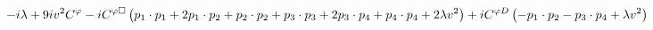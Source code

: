 %
\begin{dmath*}
%
  -  i \lambda   +  9 i v^2C^{\varphi }  -  iC^{ \varphi  \Box} \left(p_{1}\nobreak\cdot\nobreak{}p_{1} + 2 p_{1}\nobreak\cdot\nobreak{}p_{2} + p_{2}\nobreak\cdot\nobreak{}p_{2} + p_{3}\nobreak\cdot\nobreak{}p_{3} + 2 p_{3}\nobreak\cdot\nobreak{}p_{4} + p_{4}\nobreak\cdot\nobreak{}p_{4} + 2 \lambda v^2\right)  +  iC^{ \varphi  D} \left( - p_{1}\nobreak\cdot\nobreak{}p_{2} - p_{3}\nobreak\cdot\nobreak{}p_{4} + \lambda v^2\right)
%
\end{dmath*}
%
